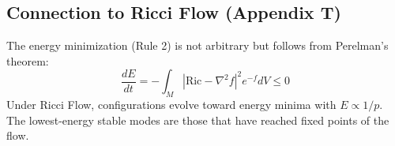\subsection{Connection to Ricci Flow (Appendix T)}

The energy minimization (Rule 2) is not arbitrary but follows from Perelman's theorem:
\begin{equation}
    \frac{dE}{dt} = -\int_M |\text{Ric} - \nabla^2 f|^2 e^{-f} dV \leq 0
\end{equation}
Under Ricci Flow, configurations evolve toward energy minima with $E \propto 1/p$. The lowest-energy stable modes are those that have reached fixed points of the flow.
